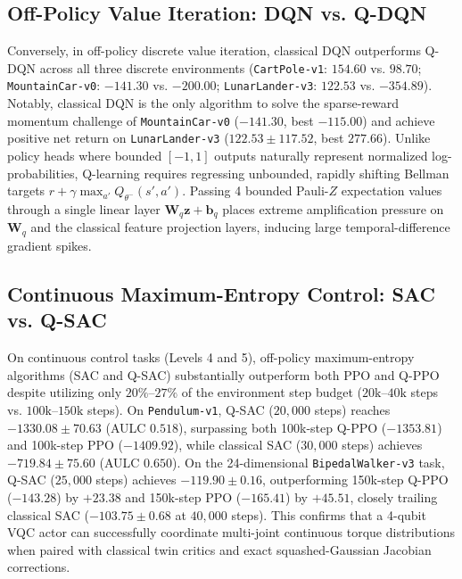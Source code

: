 \documentclass[conference]{IEEEtran}
\begin{document}
\subsection{Off-Policy Value Iteration: DQN vs. Q-DQN}
Conversely, in off-policy discrete value iteration, classical DQN outperforms Q-DQN across all three discrete environments (\texttt{CartPole-v1}: $154.60$ vs. $98.70$; \texttt{MountainCar-v0}: $-141.30$ vs. $-200.00$; \texttt{LunarLander-v3}: $122.53$ vs. $-354.89$). Notably, classical DQN is the only algorithm to solve the sparse-reward momentum challenge of \texttt{MountainCar-v0} ($-141.30$, best $-115.00$) and achieve positive net return on \texttt{LunarLander-v3} ($122.53 \pm 117.52$, best $277.66$). Unlike policy heads where bounded $[-1,1]$ outputs naturally represent normalized log-probabilities, Q-learning requires regressing unbounded, rapidly shifting Bellman targets $r + \gamma \max_{a'} Q_{\theta^-}(s', a')$. Passing 4 bounded Pauli-$Z$ expectation values through a single linear layer $\mathbf{W}_q \mathbf{z} + \mathbf{b}_q$ places extreme amplification pressure on $\mathbf{W}_q$ and the classical feature projection layers, inducing large temporal-difference gradient spikes.

\subsection{Continuous Maximum-Entropy Control: SAC vs. Q-SAC}
On continuous control tasks (Levels 4 and 5), off-policy maximum-entropy algorithms (SAC and Q-SAC) substantially outperform both PPO and Q-PPO despite utilizing only $20\%$--$27\%$ of the environment step budget ($20\text{k}$--$40\text{k}$ steps vs. $100\text{k}$--$150\text{k}$ steps). On \texttt{Pendulum-v1}, Q-SAC ($20,000$ steps) reaches $-1330.08 \pm 70.63$ (AULC $0.518$), surpassing both 100k-step Q-PPO ($-1353.81$) and 100k-step PPO ($-1409.92$), while classical SAC ($30,000$ steps) achieves $-719.84 \pm 75.60$ (AULC $0.650$). On the 24-dimensional \texttt{BipedalWalker-v3} task, Q-SAC ($25,000$ steps) achieves $-119.90 \pm 0.16$, outperforming 150k-step Q-PPO ($-143.28$) by $+23.38$ and 150k-step PPO ($-165.41$) by $+45.51$, closely trailing classical SAC ($-103.75 \pm 0.68$ at $40,000$ steps). This confirms that a 4-qubit VQC actor can successfully coordinate multi-joint continuous torque distributions when paired with classical twin critics and exact squashed-Gaussian Jacobian corrections.
\end{document}

